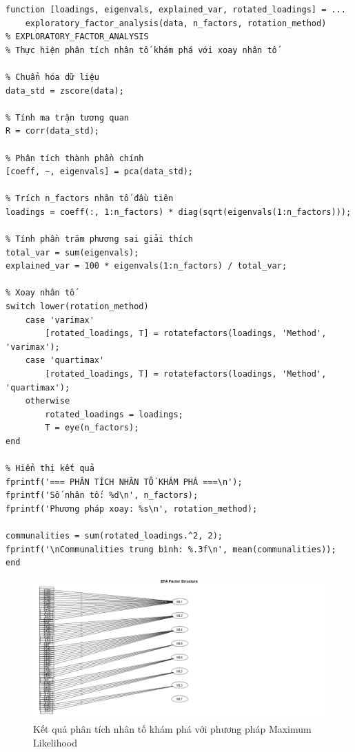 \begin{matlab}
\begin{lstlisting}
function [loadings, eigenvals, explained_var, rotated_loadings] = ...
    exploratory_factor_analysis(data, n_factors, rotation_method)
% EXPLORATORY_FACTOR_ANALYSIS
% Thực hiện phân tích nhân tố khám phá với xoay nhân tố

% Chuẩn hóa dữ liệu
data_std = zscore(data);

% Tính ma trận tương quan
R = corr(data_std);

% Phân tích thành phần chính
[coeff, ~, eigenvals] = pca(data_std);

% Trích n_factors nhân tố đầu tiên
loadings = coeff(:, 1:n_factors) * diag(sqrt(eigenvals(1:n_factors)));

% Tính phần trăm phương sai giải thích
total_var = sum(eigenvals);
explained_var = 100 * eigenvals(1:n_factors) / total_var;

% Xoay nhân tố
switch lower(rotation_method)
    case 'varimax'
        [rotated_loadings, T] = rotatefactors(loadings, 'Method', 'varimax');
    case 'quartimax'
        [rotated_loadings, T] = rotatefactors(loadings, 'Method', 'quartimax');
    otherwise
        rotated_loadings = loadings;
        T = eye(n_factors);
end

% Hiển thị kết quả
fprintf('=== PHÂN TÍCH NHÂN TỐ KHÁM PHÁ ===\n');
fprintf('Số nhân tố: %d\n', n_factors);
fprintf('Phương pháp xoay: %s\n', rotation_method);

communalities = sum(rotated_loadings.^2, 2);
fprintf('\nCommunalities trung bình: %.3f\n', mean(communalities));
end
\end{lstlisting}
\end{matlab}

\begin{figure}[h!]
    \centering
    \includegraphics[width=0.8\linewidth]{../../assets/images/EFA_ML.png}
    \caption{Kết quả phân tích nhân tố khám phá với phương pháp Maximum Likelihood}
\end{figure}

